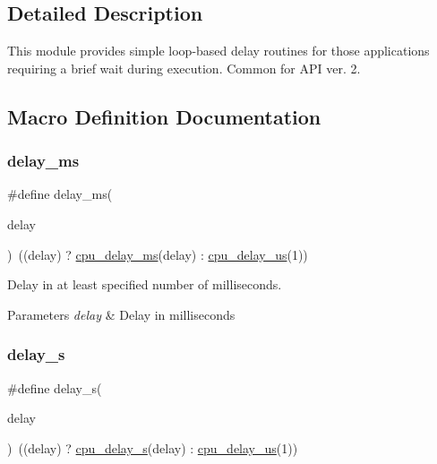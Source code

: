 \subsection{Detailed Description}
This module provides simple loop-\/based delay routines for those applications requiring a brief wait during execution. Common for A\+PI ver. 2. 

\subsection{Macro Definition Documentation}
\mbox{\label{group__group__common__services__delay_gad917a5d772ddbd99ad97a1c999ce40d4}} 
\subsubsection{\texorpdfstring{delay\_ms}{delay\_ms}}
{\footnotesize\ttfamily \#define delay\+\_\+ms(\begin{DoxyParamCaption}\item[{}]{delay }\end{DoxyParamCaption})~((delay) ? \mbox{\hyperlink{systick__counter_8h_acdbe5e2991f2b665ef2babea7b978667}{cpu\+\_\+delay\+\_\+ms}}(delay) \+: \mbox{\hyperlink{systick__counter_8h_a25de6f000bcc542a5f3292e369e49681}{cpu\+\_\+delay\+\_\+us}}(1))}



Delay in at least specified number of milliseconds. 


\begin{DoxyParams}{Parameters}
{\em delay} & Delay in milliseconds \\
\hline
\end{DoxyParams}
\mbox{\label{group__group__common__services__delay_gafdccadc6c16847907b3252cdef83e8b0}} 
\subsubsection{\texorpdfstring{delay\_s}{delay\_s}}
{\footnotesize\ttfamily \#define delay\+\_\+s(\begin{DoxyParamCaption}\item[{}]{delay }\end{DoxyParamCaption})~((delay) ? \mbox{\hyperlink{systick__counter_8h_ac16436855dffc7dc7939324a0408adb0}{cpu\+\_\+delay\+\_\+s}}(delay) \+: \mbox{\hyperlink{systick__counter_8h_a25de6f000bcc542a5f3292e369e49681}{cpu\+\_\+delay\+\_\+us}}(1))}




